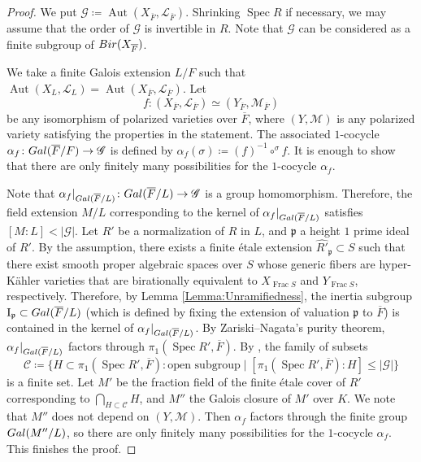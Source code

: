 \documentclass[11pt,reqno,oneside]{amsart}
\numberwithin{equation}{section}
\theoremstyle{definition}
\DeclareMathOperator{\Aut}{Aut}
\DeclareMathOperator{\Spec}{Spec}
\DeclareMathOperator{\Frac}{Frac}
\newcommand{\Gal}{{\rm Gal}}
\newcommand{\Bir}{{\rm Bir}}
\newcommand\rI{\mathrm{I}}
\newcommand{\p}{\mathfrak{p}}
\begin{document}
\begin{proof}
We put $\mathscr{G} \coloneqq \Aut(X_{\overline{F}}, \mathscr{L}_{\overline{F}})$.
Shrinking $\Spec R$ if necessary, we may assume that the order of $\mathscr{G}$ is invertible
in $R$.
Note that $\mathscr{G}$ can be considered as a finite subgroup of
$\Bir(X_{\overline{F}})$.

We take a finite Galois extension $L/F$ such that $\Aut(X_{L},\mathscr{L}_{L}) = \Aut (X_{\overline{F}}, \mathscr{L}_{\overline{F}})$.
Let $$f \colon (X_{\overline{F}}, \mathscr{L}_{\overline{F}})
\simeq
(Y_{\overline{F}}, \mathscr{M}_{\overline{F}})$$
be any isomorphism of polarized varieties over $\overline{F}$, where $(Y, \mathscr{M})$ is any polarized variety satisfying the properties in the statement.
The associated $1$-cocycle
$\alpha_{f} \colon \Gal(\overline{F}/F) \to \mathscr{G}$
is defined by
$\alpha_{f}(\sigma) \coloneqq (f)^{-1} \circ ^{\sigma}\!f$.
It is enough to show that
there are only finitely many possibilities for the $1$-cocycle $\alpha_f$.

Note that $\alpha_{f}|_{\Gal(\overline{F}/L)} \colon \Gal(\overline{F}/L) \rightarrow \mathscr{G}$ is a group homomorphism.
Therefore, the field extension $M/L$ corresponding to the kernel of $\alpha_{f}|_{\Gal(\overline{F}/L)}$ satisfies
$[M:L] < |\mathscr{G}|$.
Let $R'$ be a normalization of $R$ in $L$, and $\p$ a height $1$ prime ideal of $R'$.
By the assumption, there exists a finite \'etale extension $\widehat{R'}_{\p} \subset S$ such that
there exist smooth proper algebraic spaces over $S$ whose generic fibers are hyper-Kähler varieties that are birationally equivalent to $X_{\Frac S}$ and $Y_{\Frac S}$, respectively.
Therefore, by Lemma \ref{Lemma:Unramifiedness}, the inertia subgroup $\rI_{\p} \subset \Gal(\overline{F}/L)$ (which is defined by fixing the extension of valuation $\p$ to $\overline{F}$) is contained in the kernel of $\alpha_{f}|_{\Gal(\overline{F}/L)}$.
By Zariski--Nagata's purity theorem, $\alpha_{f}|_{\Gal(\overline{F}/L)}$ factors through $\pi_{1}(\Spec R', \overline{F})$.
By \cite[Proposition 2.3, Theorem 2.9]{Harada2009}, the family of subsets
\[
\mathcal{C}\coloneqq \{ H \subset \pi_{1}(\Spec R', \overline{F})\colon \text{open subgroup} \mid [\pi_{1}(\Spec R', \overline{F}) : H] \leq |\mathscr{G}|\}
\]
is a finite set.
Let $M'$ be the fraction field of the finite \'etale cover of $R'$ corresponding to $\bigcap_{H \subset \mathcal{C}} H$, and $M''$ the Galois closure of $M'$ over $K$. We note that $M''$ does not depend on $(Y,\mathscr{M})$. 
Then $\alpha_{f}$ factors through the finite group $\Gal(M''/L)$, so there are only finitely many possibilities for the $1$-cocycle $\alpha_f$. This finishes the proof.
\end{proof}
\end{document}
